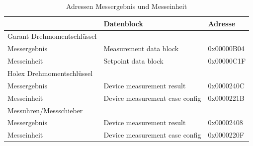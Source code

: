 \begin{table}[H]
	\centering
	\begin{tabular}[H]{l|l|l}
		 & Datenblock & Adresse \\
		\hline
		Garant Drehmomentschlüssel & & \\
		Messergebnis & Measurement data block & 0x00000B04 \\
		Messeinheit & Setpoint data block & 0x00000C1F \\
		\hline
		Holex Drehmomentschlüssel & & \\
		Messergebnis & Device measurement result & 0x0000240C \\
		Messeinheit & Device measurement case config & 0x0000221B \\
		\hline
		Messuhren/Messschieber & & \\
		Messergebnis & Device measurement result & 0x00002408 \\
		Messeinheit & Device measurement case config & 0x0000220F \\
		
	\end{tabular}
	\caption{Adressen Messergebnis und Messeinheit}
\end{table}

